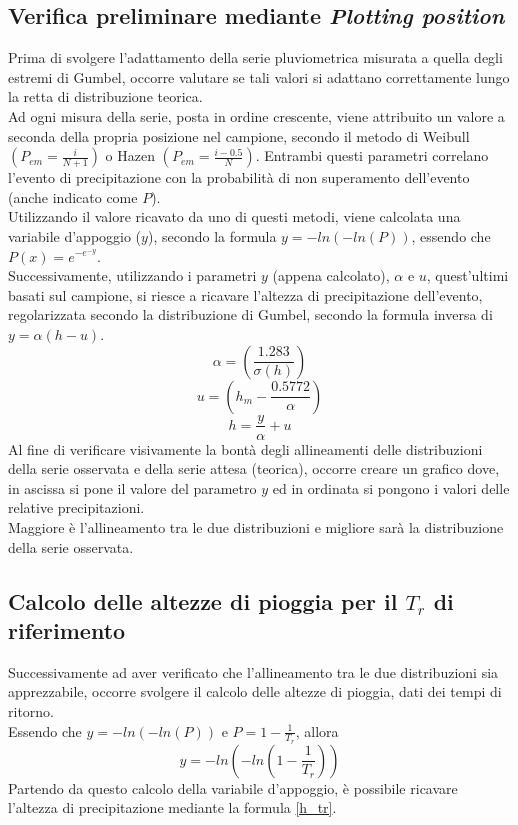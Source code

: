 \subsection{Verifica preliminare mediante \textit{Plotting position}}
Prima di svolgere l'adattamento della serie pluviometrica misurata a quella degli estremi di Gumbel, occorre valutare se tali valori si adattano correttamente lungo la retta di distribuzione teorica.\\
Ad ogni misura della serie, posta in ordine crescente, viene attribuito un valore a seconda della propria posizione nel campione, secondo il metodo di Weibull $(P_{em}= \frac{i}{N+1})$ o Hazen $\left(P_{em}=\frac{i-0.5}{N}\right)$. Entrambi questi parametri correlano l'evento di precipitazione con la probabilità di non superamento dell'evento (anche indicato come $P$).\\
Utilizzando il valore ricavato da uno di questi metodi, viene calcolata una variabile d'appoggio ($y$), secondo la formula $y = -ln(-ln(P))$, essendo che $P(x)= e ^{-e^ {-y}}$.\\
\noindent Successivamente, utilizzando i parametri $y$ (appena calcolato), $\alpha$ e $u$, quest'ultimi basati sul campione, si riesce a ricavare l'altezza di precipitazione dell'evento, regolarizzata secondo la distribuzione di Gumbel, secondo la formula inversa di $y = \alpha (h - u)$.
\begin{equation}
    \alpha = \left(\frac{1.283}{\sigma(h)}\right)
\end{equation}
\begin{equation}
    u = \left( h_m - \frac{0.5772}{\alpha} \right)
\end{equation}
\begin{equation}
    h = \frac{y}{\alpha}+u
    \label{h_tr}
\end{equation}
Al fine di verificare visivamente la bontà degli allineamenti delle distribuzioni della serie osservata e della serie attesa (teorica), occorre creare un grafico dove, in ascissa si pone il valore del parametro $y$ ed in ordinata si pongono i valori delle relative precipitazioni.\\
Maggiore è l'allineamento tra le due distribuzioni e migliore sarà la distribuzione della serie osservata.

\subsection{Calcolo delle altezze di pioggia per il $T_r$ di riferimento}
Successivamente ad aver verificato che l'allineamento tra le due distribuzioni sia apprezzabile, occorre svolgere il calcolo delle altezze di pioggia, dati dei tempi di ritorno.\\
Essendo che $y = -ln(-ln(P))$ e $P = 1-\frac{1}{T_r}$, allora 
\begin{equation}
y = -ln(-ln(1-\frac{1}{T_r}))
\end{equation}
Partendo da questo calcolo della variabile d'appoggio, è possibile ricavare l'altezza di precipitazione mediante la formula \ref{h_tr}.


